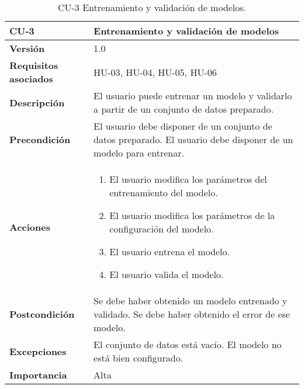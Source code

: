 \begin{table}[p]
	\centering
	\begin{tabularx}{\linewidth}{ p{} p{} }
		\toprule
		\textbf{CU-3}    & \textbf{Entrenamiento y validación de modelos}\\
		\toprule
		\textbf{Versión}              & 1.0    \\
		\textbf{Requisitos asociados} & HU-03, HU-04, HU-05, HU-06 \\
		\textbf{Descripción}          & El usuario puede entrenar un modelo y validarlo a partir de un conjunto de datos preparado.\\
		\textbf{Precondición}         & El usuario debe disponer de un conjunto de datos preparado. El usuario debe disponer de un modelo para entrenar.\\
		\textbf{Acciones}             &
		\begin{enumerate}
			\def\labelenumi{\arabic{enumi}.}
			\tightlist
			\item El usuario modifica los parámetros del entrenamiento del modelo.
            \item El usuario modifica los parámetros de la configuración del modelo.
            \item El usuario entrena el modelo.
            \item El usuario valida el modelo.
		\end{enumerate}\\
		\textbf{Postcondición}        & Se debe haber obtenido un modelo entrenado y validado. Se debe haber obtenido el error de ese modelo. \\
		\textbf{Excepciones}          & El conjunto de datos está vacío. El modelo no está bien configurado.  \\
		\textbf{Importancia}          & Alta \\
		\bottomrule
	\end{tabularx}
	\caption{CU-3 Entrenamiento y validación de modelos.}
\end{table}


